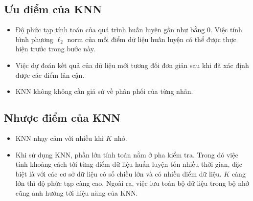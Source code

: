 


\subsection{Ưu điểm của KNN}
\begin{itemize}
\item Độ phức tạp tính toán của quá trình huấn luyện gần như bằng 0. Việc tính bình phương $\ell_2$ norm của mỗi điểm dữ liệu huấn luyện có thể được thực hiện trước trong bước này.

\item Việc dự đoán kết quả của dữ liệu mới tương đối đơn giản sau khi đã xác
định được các điểm lân cận.

\item KNN không không cần giả sử về phân phối của từng nhãn.
\end{itemize}



\subsection{Nhược điểm của KNN}
\begin{itemize}
\item KNN nhạy cảm với nhiễu khi $K$ nhỏ.

\item Khi sử dụng KNN, phần lớn tính toán nằm ở pha
kiểm tra. Trong đó việc tính khoảng cách tới {từng} điểm dữ liệu
huấn luyện tốn nhiều thời gian, đặc biệt là với các cơ sở dữ
liệu có số chiều lớn và có nhiều điểm dữ liệu. $K$ càng lớn thì độ phức
tạp càng cao. Ngoài ra, việc lưu toàn bộ dữ liệu trong bộ nhớ cũng
ảnh hưởng tới hiệu năng của KNN.

\end{itemize}




